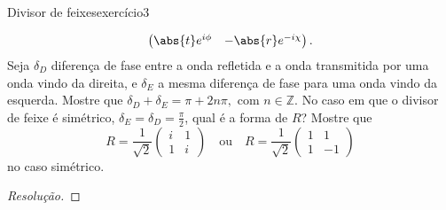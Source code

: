 \begin{exercício}{Divisor de feixes}{exercício3}
\begin{enumerate}[label=(\alph*)]
\begin{equation*}
\begin{pmatrix}
                    \abs{t}e^{i\phi} & -\abs{r} e^{-i\chi}\\
                \end{pmatrix}.
            \end{equation*}
            Seja \(\delta_D\) diferença de fase entre a onda refletida e a onda transmitida por uma onda vindo da direita, e \(\delta_E\) a mesma diferença de fase para uma onda vindo da esquerda. Mostre que \(\delta_D + \delta_E = \pi + 2n\pi,\) com \(n \in \mathbb{Z}\). No caso em que o divisor de feixe é simétrico, \(\delta_E = \delta_D = \frac\pi2\), qual é a forma de \(R\)? Mostre que
            \begin{equation*}
                R = \frac1{\sqrt{2}}\begin{pmatrix}
                    i & 1\\
                    1 & i
                \end{pmatrix}
                \quad\text{ou}\quad
                R = \frac1{\sqrt{2}}\begin{pmatrix}
                    1 & 1\\
                    1 & -1
                \end{pmatrix}
            \end{equation*}
            no caso simétrico.
    \end{enumerate}
\end{exercício}
\begin{proof}[Resolução]

\end{proof}
